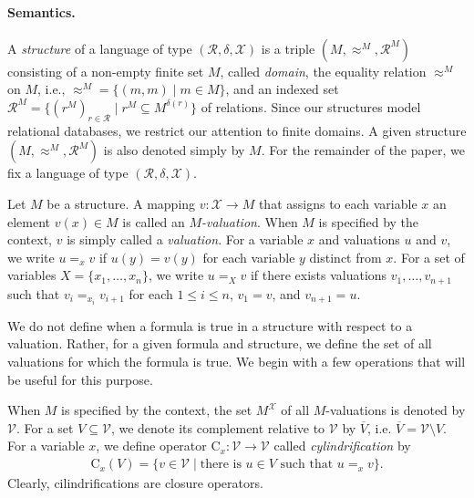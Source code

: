 \documentclass{lmcs}
\def\tu#1{( #1)}
\def\C{\textrm{C}}
\def\R{\mathcal R}
\def\X{\mathcal X}
\def\V{\mathcal V}
\newcommand{\st}{%
	\ensuremath{\;|\;}
}
\begin{document}
\paragraph{Semantics.} A \emph{structure} of a language of type $\tu{\R,\delta, \X}$ is a triple $\tu{M,\approx^M, \R^M}$ consisting of a non-empty finite set $M$, called \emph{domain},  the equality relation $\approx^M$ on $M$, i.e., $\approx^M=\{\tu{m,m}\st m\in M\}$, and an indexed set $\R^M=\{(r^M)_{r\in \R}\st r^M\subseteq M^{\delta(r)}\}$ 
 of relations. Since our structures model relational databases, we restrict our attention to finite domains. A given structure $\tu{M,\approx^M,\R^M}$ is also denoted simply by $M$.  For the remainder of the paper, we fix a language of type $\tu{\R,\delta, \X}$.
 
 Let $M$ be a structure.  A mapping $v:\!\X\to M$ that assigns to each variable $x$ an element $v(x)\in M$ is called an \emph{$M$-valuation}. When $M$ is specified by the context, $v$ is simply called  a \emph{valuation}.  For a variable $x$ and valuations $u$ and $v$, we write $u=_xv$ if $u(y)=v(y)$ for each variable $y$ distinct from $x$. For a set of variables $X=\{x_1,\ldots,x_n\}$, we write $u=_Xv$ if there exists valuations $v_1,\ldots, v_{n+1}$ such that $v_i=_{x_i}v_{i+1}$ for each $1\leq i\leq n$, $v_1=v$, and $v_{n+1}=u$.
 
We do not define when a formula is true in a structure with respect to a valuation. Rather,  for a given formula and structure, we define the set of all valuations for which the formula is true. We begin with a few operations that will be useful for this purpose. 
 
 When $M$ is specified by the context, the set $M^\X$ of all $M$-valuations is denoted by $\V$. For a set $V\subseteq\V$, we denote its complement relative to $\V$ by $\overline V$, i.e. $\overline{V}=\V\setminus V$.   
For a variable $x$, we define operator $\C_x\!:\V\to \V$ called \emph{cylindrification} by
\begin{align}
\C_x(V)=\{v\in\V\st \text{there is }u\in V\text{ such that } u=_xv\}.
\end{align}
Clearly, cilindrifications are closure operators.
\end{document}
